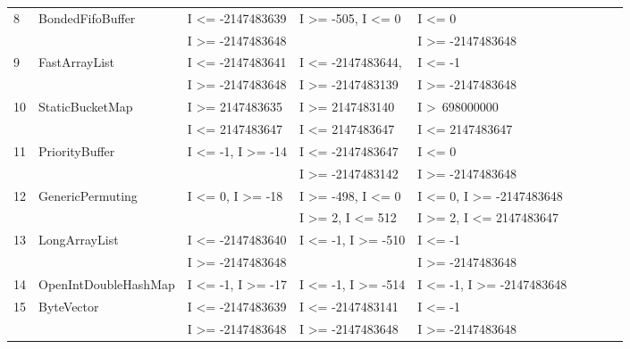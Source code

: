 \documentclass[runningheads,a4paper]{llncs}
\begin{document}
\begin{table}[h]
{{\begin{tabular}{|l|l|l|l|l|l|l|l|l|}
8	& BondedFifoBuffer			& I \textless= -2147483639 					& I \textgreater= -505, I \textless= 0		& I \textless= 0 								\\
	&                                             & I \textgreater= -2147483648				& 										& I \textgreater= -2147483648				\\	
9	& FastArrayList				& I \textless= -2147483641 					& I \textless= -2147483644, 				& I \textless= -1								\\ 
	&                                             & I \textgreater= -2147483648				& I \textgreater= -2147483139			& I \textgreater= -2147483648				\\	
10	& StaticBucketMap			& I \textgreater= 2147483635				& I \textgreater= 2147483140			& I \textgreater~698000000					\\ 
	&                                             & I \textless= 2147483647					& I \textless= 2147483647				& I \textless= 2147483647			   		\\	
11	& PriorityBuffer				& I \textless= -1, I \textgreater= -14			& I \textless= -2147483647 				& I \textless= 0								\\
	&                                             & 											& I \textgreater= -2147483142			& I \textgreater= -2147483648			   	\\	 
12	& GenericPermuting			& I \textless= 0, I \textgreater= -18			& I \textgreater= -498, I \textless= 0		& I \textless= 0, I \textgreater= -2147483648	\\ 	%
	&                                             & 											& I \textgreater= 2, I \textless= 512		& I \textgreater= 2, I \textless= 2147483647	\\
13	& LongArrayList				& I \textless= -2147483640					& I \textless= -1, I \textgreater= -510		& I \textless= -1								\\ 
	&                                             & I \textgreater= -2147483648				& 										& I \textgreater= -2147483648				\\
14	& OpenIntDoubleHashMap	& I \textless= -1, I \textgreater= -17			& I \textless= -1, I \textgreater= -514		& I \textless= -1, I \textgreater= -2147483648	\\ 
15	& ByteVector					& I \textless= -2147483639					& I \textless= -2147483141				& I \textless= -1								\\ 	%
	&                                             & I \textgreater= -2147483648				& I \textgreater= -2147483648			& I \textgreater= -2147483648				\\	

\end{tabular}}}
\end{table}
\end{document}
